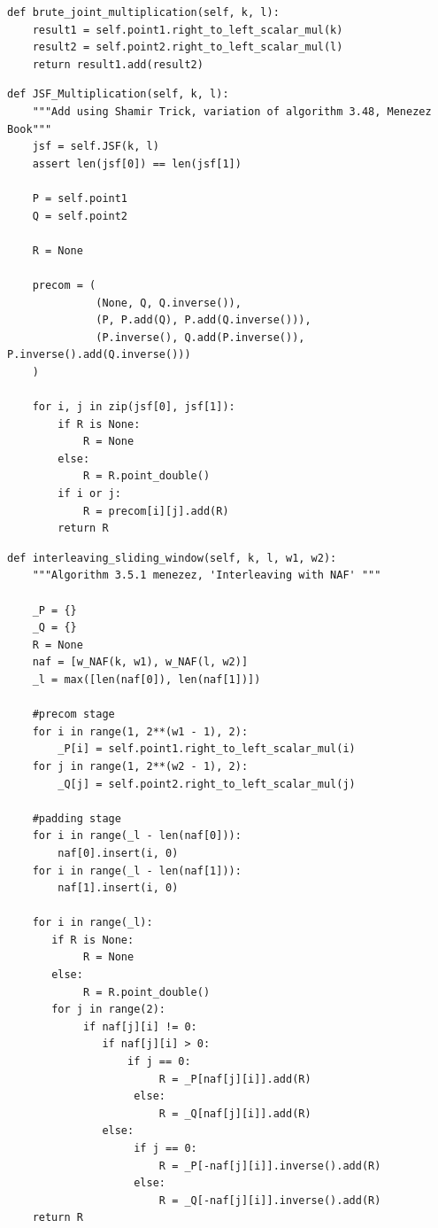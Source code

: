 \begin{lstlisting}
def brute_joint_multiplication(self, k, l):
    result1 = self.point1.right_to_left_scalar_mul(k)
    result2 = self.point2.right_to_left_scalar_mul(l)
    return result1.add(result2)
\end{lstlisting}	

\begin{lstlisting}
def JSF_Multiplication(self, k, l):
    """Add using Shamir Trick, variation of algorithm 3.48, Menezez Book"""
    jsf = self.JSF(k, l)
    assert len(jsf[0]) == len(jsf[1])

    P = self.point1
    Q = self.point2

    R = None

    precom = (
              (None, Q, Q.inverse()),
              (P, P.add(Q), P.add(Q.inverse())),
              (P.inverse(), Q.add(P.inverse()), P.inverse().add(Q.inverse()))
    )

    for i, j in zip(jsf[0], jsf[1]):
        if R is None:
            R = None
        else:
            R = R.point_double()
        if i or j:
            R = precom[i][j].add(R)
        return R
\end{lstlisting}

\begin{lstlisting}
def interleaving_sliding_window(self, k, l, w1, w2):
    """Algorithm 3.5.1 menezez, 'Interleaving with NAF' """

    _P = {}
    _Q = {}
    R = None
    naf = [w_NAF(k, w1), w_NAF(l, w2)]
    _l = max([len(naf[0]), len(naf[1])])

    #precom stage
    for i in range(1, 2**(w1 - 1), 2):
        _P[i] = self.point1.right_to_left_scalar_mul(i)
    for j in range(1, 2**(w2 - 1), 2):
        _Q[j] = self.point2.right_to_left_scalar_mul(j)
 
    #padding stage
    for i in range(_l - len(naf[0])):
        naf[0].insert(i, 0)
    for i in range(_l - len(naf[1])):
        naf[1].insert(i, 0)

    for i in range(_l):
       if R is None:
            R = None
       else:
            R = R.point_double()
       for j in range(2):
            if naf[j][i] != 0:
               if naf[j][i] > 0:
                   if j == 0:
                        R = _P[naf[j][i]].add(R)
                    else:
                        R = _Q[naf[j][i]].add(R)
               else:
                    if j == 0:
                        R = _P[-naf[j][i]].inverse().add(R)
                    else:
                        R = _Q[-naf[j][i]].inverse().add(R)
    return R

\end{lstlisting}

